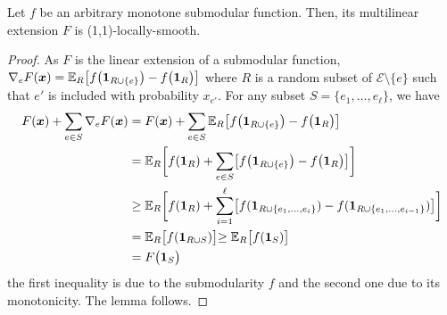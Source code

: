 \begin{lemma}	\label{lem:sub-max-locally-smooth}
Let $f$ be an arbitrary monotone submodular function. Then, its multilinear extension 
$F$ is (1,1)-locally-smooth.
\end{lemma}
%
\begin{proof}
As $F$ is the linear extension of a submodular function, 
$\nabla_{e} F(\bm{x}) = \mathbb{E}_{R}\bigl[ f\bigl(\bm{1}_{R \cup \{e\}}\bigr) - f\bigl(\bm{1}_{R}\bigr) \bigr]$
where $R$ is a random subset of $\mathcal{E} \setminus \{e\}$ such that $e'$ is included with probability $x_{e'} $.
For any subset $S = \{e_{1}, \ldots, e_{\ell}\}$, we have
\begin{align*}
F(\vect{x}) + \sum_{e \in S} \nabla_{e} F(\vect{x}) 
&= F(\vect{x}) + \sum_{e \in S} \mathbb{E}_{R} \bigl[ f\bigl(\vect{1}_{R \cup \{e\}}\bigr) - f\bigl(\vect{1}_{R}\bigr) \bigr] \\
%
&= \mathbb{E}_{R} \biggl[ f(\vect{1}_{R}) + \sum_{e \in S} \bigl[ f\bigl(\vect{1}_{R \cup \{e\}}\bigr) - f\bigl(\vect{1}_{R}\bigr) \bigr] \biggl] \\
%
&\geq \mathbb{E}_{R} \biggl[ f(\vect{1}_{R}) + \sum_{i=1}^{\ell} \bigl[ f(\vect{1}_{R \cup \{e_{1}, \ldots, e_{i}\}}) - 
								f(\vect{1}_{R \cup \{e_{1}, \ldots, e_{i-1}\}}) \bigr] \biggr] \\
%
&= \mathbb{E}_{R} \bigl[ f(\vect{1}_{R \cup S})  \bigl]  \geq \mathbb{E}_{R} \bigl[ f(\vect{1}_{S})  \bigl] \\
%
&= F\bigl( \vect{1}_{S} \bigr)
\end{align*}
the first inequality is due to the submodularity $f$ and the second one due to its monotonicity.
The lemma follows.
\end{proof}





